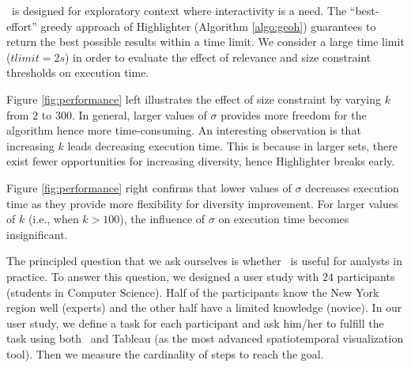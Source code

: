 

\newpage
 \framework\ is designed for exploratory context where interactivity is a need. The ``best-effort'' greedy approach of {\sc Highlighter} (Algorithm \ref{algo:geoh}) guarantees to return the best possible results within a time limit. We consider a large time limit ($tlimit = 2s$) in order to evaluate the effect of relevance and size constraint thresholds on execution time.

Figure \ref{fig:performance} left illustrates the effect of size constraint by varying $k$ from $2$ to $300$. In general, larger values of $\sigma$ provides more freedom for the algorithm hence more time-consuming. An interesting observation is that increasing $k$ leads decreasing execution time. This is because in larger sets, there exist fewer opportunities for increasing diversity, hence {\sc Highlighter} breaks early.

Figure \ref{fig:performance} right confirms that lower values of $\sigma$ decreases execution time as they provide more flexibility for diversity improvement. For larger values of $k$ (i.e., when $k >100$), the influence of $\sigma$ on execution time becomes insignificant.

\vspace{5pt}
The principled question that we ask ourselves is whether \framework\ is useful for analysts in practice. To answer this question, we designed a user study with $24$ participants (students in Computer Science). Half of the participants know the New York region well (experts) and the other half have a limited knowledge (novice). In our user study, we define a task for each participant and ask him/her to fulfill the task using both \framework\ and {\sc Tableau} (as the most advanced spatiotemporal visualization tool). Then we measure the cardinality of steps to reach the goal.

